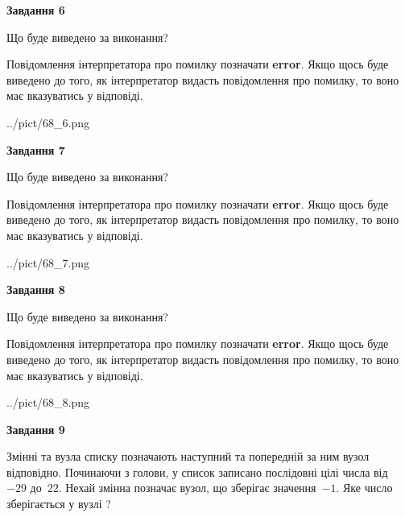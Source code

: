 \documentclass[12pt, ukrainian]{article}
\begin{document}
{\begin {large}
{\begin {center}\textbf{Завдання 6}\end {center}}\par
Що буде виведено за виконання?

Повідомлення інтерпретатора про помилку позначати \textbf{error}.
Якщо щось буде виведено до того, як інтерпретатор видасть повідомлення про помилку, 
то воно має вказуватись у відповіді. \par


\begin{center}
	{../pict/68_6.png}
\end{center}
\newpage

{\begin {center}\textbf{Завдання 7}\end {center}}\par
Що буде виведено за виконання?

Повідомлення інтерпретатора про помилку позначати \textbf{error}.
Якщо щось буде виведено до того, як інтерпретатор видасть повідомлення про помилку, 
то воно має вказуватись у відповіді. \par


\begin{center}
	{../pict/68_7.png}
\end{center}
\newpage

{\begin {center}\textbf{Завдання 8}\end {center}}\par
Що буде виведено за виконання?

Повідомлення інтерпретатора про помилку позначати \textbf{error}.
Якщо щось буде виведено до того, як інтерпретатор видасть повідомлення про помилку, 
то воно має вказуватись у відповіді. \par


\begin{center}
	{../pict/68_8.png}
\end{center}
\newpage

{\begin {center}\textbf{Завдання 9}\end {center}}\par
Змінні  та  вузла списку позначають наступний та попередній за ним вузол відповідно. Починаючи з голови, у список записано послідовні цілі числа від~$-29$ до~$22$. Нехай змінна  позначає вузол, що зберігає значення~$-1$.
Яке число зберігається у вузлі  ?\par
\newpage


\end{large}}
\end{document}
